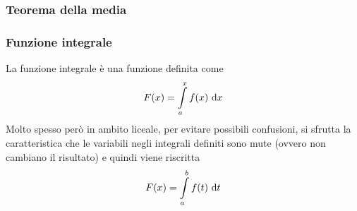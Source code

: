 \subsubsection{Teorema della media}
\subsubsection{Funzione integrale}
La funzione integrale è una funzione definita come
\begin{equation*}
  F(x)=\int\limits_{a}^{x} f(x)\,\mathop{}\!\mathrm{d} x
\end{equation*}
Molto spesso però in ambito liceale, per evitare possibili confusioni, si sfrutta la caratteristica
che le variabili negli integrali definiti sono mute (ovvero non cambiano il risultato) e quindi
viene riscritta
\begin{equation*}
  F(x)=\int\limits_{a}^{b} f(t)\,\mathop{}\!\mathrm{d} t 
\end{equation*}
